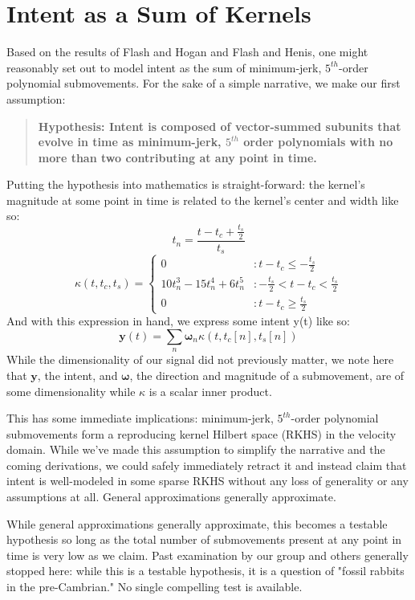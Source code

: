 \documentclass[10pt]{article}
\begin{document}
\section*{Intent as a Sum of Kernels}
Based on the results of Flash and Hogan and Flash and Henis, one might reasonably set out to model intent as the sum of minimum-jerk, $5^{th}$-order polynomial submovements. For the sake of a simple narrative, we make our first assumption:
\begin{quote}
\textbf{Hypothesis: Intent is composed of vector-summed subunits that evolve in time as minimum-jerk, $5^{th}$ order polynomials with no more than two contributing at any point in time.}
\end{quote}
Putting the hypothesis into mathematics is straight-forward: the kernel's magnitude at some point in time is related to the kernel's center and width like so:
\begin{equation}
t_n=\frac{t-t_c+\frac{t_s}{2}}{t_s}
\end{equation}
\begin{equation}
\kappa(t,t_c,t_s)=
  \begin{cases}
  0 & : t-t_c \leq -\frac{t_s}{2}\\
  10t_n^3-15t_n^4+6t_n^5 & : -\frac{t_s}{2} < t-t_c < \frac{t_s}{2}\\
  0 & : t-t_c \geq \frac{t_s}{2}
  \end{cases}
\end{equation}
And with this expression in hand, we express some intent y(t) like so:
\begin{equation}
\boldsymbol{y}(t)=\sum_n \boldsymbol{\omega}_n \kappa(t,t_c[n],t_s[n])
\end{equation}
While the dimensionality of our signal did not previously matter, we note here that $\boldsymbol{y}$, the intent, and $\boldsymbol{\omega}$, the direction and magnitude of a submovement, are of some dimensionality while $\kappa$ is a scalar inner product.


This has some immediate implications: minimum-jerk, $5^{th}$-order polynomial submovements form a reproducing kernel Hilbert space (RKHS) in the velocity domain. While we've made this assumption to simplify the narrative and the coming derivations, we could safely immediately retract it and instead claim that intent is well-modeled in some sparse RKHS without any loss of generality or any assumptions at all. General approximations generally approximate.

While general approximations generally approximate, this becomes a testable hypothesis so long as the total number of submovements present at any point in time is very low as we claim. Past examination by our group and others generally stopped here: while this is a testable hypothesis, it is a question of "fossil rabbits in the pre-Cambrian." No single compelling test is available.
\end{document}
